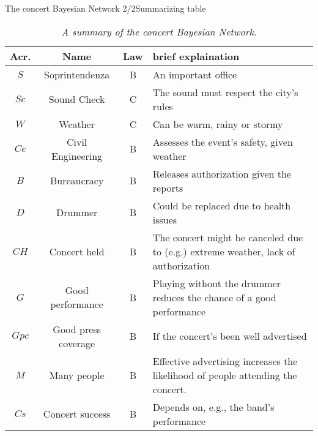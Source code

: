 \documentclass[10pt,xcolor={table,dvipsnames}]{beamer} 		%
\theoremstyle{plain}					%
\theoremstyle{definition}
\theoremstyle{remark}
\begin{document}
	\begin{frame}{The concert Bayesian Network 2/2}{Summarizing table}
		\begin{table}[ht]
			\caption{\emph{A summary of the concert Bayesian Network.}}%
			\label{tab:BNsummary}
			\begin{tabularx}{\textwidth}{cccX}
				\toprule
				Acr. & Name & Law & brief explaination\\
				\midrule
				$S$ & Soprintendenza & B & An important office\\
				$Sc$ & Sound Check & C & The sound must respect the city's rules\\
				$W$ & Weather & C & Can be warm, rainy or stormy \\
				$Ce$ & Civil Engineering & B & Assesses the event's safety, given weather\\
				$B$ & Bureaucracy & B & Releases authorization given the reports\\
				$D$ & Drummer & B & Could be replaced due to health issues\\
				$CH$ & Concert held & B & The concert might be canceled due to (e.g.) extreme weather, lack 
											of authorization\\
				$G$ & Good performance & B & Playing without the drummer reduces the chance of a good performance\\
				$Gpc$ & Good press coverage & B & If the concert's been well advertised\\
				$M$ & Many people & B & Effective advertising increases the 
										likelihood of people attending the concert.\\
				$Cs$ & Concert success & B & Depends on, e.g., the band's performance\\
				\bottomrule
			\end{tabularx}
		\end{table}
	\end{frame}
\end{document}
